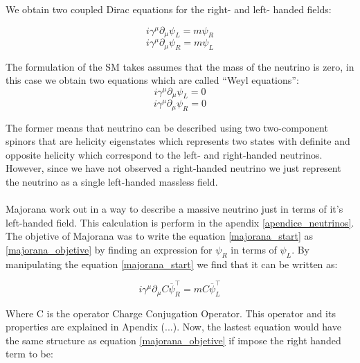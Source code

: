 We obtain two coupled Dirac equations for the right- and left- handed fields:

\begin{equation}\label{majorana_objetive}
i \gamma ^\mu \partial_\mu \psi_L = m \psi_R
\end{equation} 
\begin{equation}\label{majorana_start}
i \gamma ^\mu \partial_\mu \psi_R = m \psi_L
\end{equation} 

The formulation of the SM takes assumes that the mass of the neutrino is zero, in this case we obtain two equations which are called ``Weyl equations'':
\begin{equation}
i \gamma ^\mu \partial_\mu \psi_L = 0
\end{equation}
\begin{equation}
i \gamma ^\mu \partial_\mu \psi_R = 0
\end{equation}

The former means that neutrino can be described using two two-component spinors that are helicity eigenstates which represents two states with definite and opposite helicity which correspond to the left- and right-handed neutrinos. However, since we have not observed a right-handed neutrino we just represent the neutrino as a single left-handed massless field.  \\
\\
Majorana work out in a way to describe a massive neutrino just in terms of it's left-handed field.
This calculation is perform in the apendix \ref{apendice_neutrinos}. The objetive of Majorana was to write the equation \ref{majorana_start} as \ref{majorana_objetive} by finding an expression for $\psi_R$ in terms of $\psi_L$. By manipulating the equation \ref{majorana_start} we find that it can be written as:  

\begin{equation}
i \gamma^\mu \partial_\mu C \overline{\psi}^\intercal_R = m C \overline{\psi}^{\intercal}_L
\end{equation}

Where C is the operator Charge Conjugation Operator. This operator and its properties are explained in Apendix (...). Now, the lastest equation would have the same structure as equation \ref{majorana_objetive} if impose the right handed term to be:

